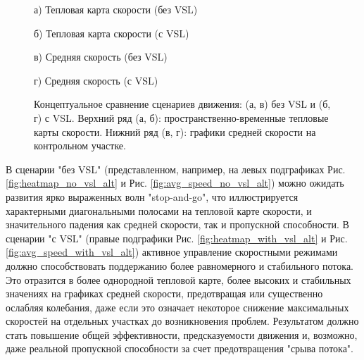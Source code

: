 \documentclass[12pt, a4paper]{article}
\begin{document}
\begin{figure}[h!]
    \centering
    \begin{minipage}{0.48\textwidth}
        \centering
        \caption*{а) Тепловая карта скорости (без VSL)} %
        \label{fig:heatmap_no_vsl_alt} %
    \end{minipage}\hfill
    \begin{minipage}{0.48\textwidth}
        \centering
        \caption*{б) Тепловая карта скорости (с VSL)}
        \label{fig:heatmap_with_vsl_alt}
    \end{minipage}

    \vspace{0.5cm} %

    \begin{minipage}{0.48\textwidth}
        \centering
        \caption*{в) Средняя скорость (без VSL)}
        \label{fig:avg_speed_no_vsl_alt}
    \end{minipage}\hfill
    \begin{minipage}{0.48\textwidth}
        \centering
        \caption*{г) Средняя скорость (с VSL)}
        \label{fig:avg_speed_with_vsl_alt}
    \end{minipage}

    \caption{Концептуальное сравнение сценариев движения: (а, в) без VSL и (б, г) с VSL. Верхний ряд (а, б): пространственно-временные тепловые карты скорости. Нижний ряд (в, г): графики средней скорости на контрольном участке.}
    \label{fig:vsl_comparison}
\end{figure}

В сценарии "без VSL" (представленном, например, на левых подграфиках Рис. \ref{fig:heatmap_no_vsl_alt} и Рис. \ref{fig:avg_speed_no_vsl_alt}) можно ожидать развития ярко выраженных волн "stop-and-go", что иллюстрируется характерными диагональными полосами на тепловой карте скорости, и значительного падения как средней скорости, так и пропускной способности. В сценарии "с VSL" (правые подграфики Рис. \ref{fig:heatmap_with_vsl_alt} и Рис. \ref{fig:avg_speed_with_vsl_alt}) активное управление скоростными режимами должно способствовать поддержанию более равномерного и стабильного потока. Это отразится в более однородной тепловой карте, более высоких и стабильных значениях на графиках средней скорости, предотвращая или существенно ослабляя колебания, даже если это означает некоторое снижение максимальных скоростей на отдельных участках до возникновения проблем. Результатом должно стать повышение общей эффективности, предсказуемости движения и, возможно, даже реальной пропускной способности за счет предотвращения "срыва потока".
\end{document}
